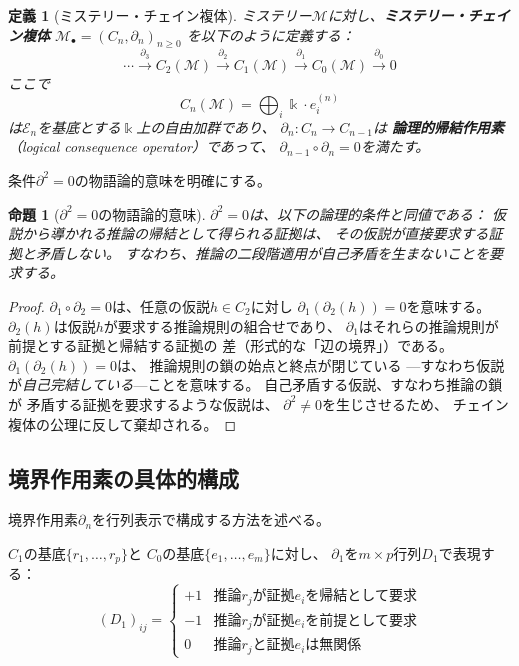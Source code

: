 \documentclass[12pt,twocolumn]{ltjsarticle}
\newtheorem{proposition}[theorem]{命題}
\newtheorem{definition}[theorem]{定義}
\newcommand{\Ev}{\mathcal{E}}
\newcommand{\Mys}{\mathcal{M}}
\newcommand{\kk}{\Bbbk}
\begin{document}
\begin{definition}[ミステリー・チェイン複体]
\label{def:mystery_chain}
ミステリー$\Mys$に対し、\textbf{ミステリー・チェイン複体}
$\Mys_\bullet = (C_n, \partial_n)_{n \geq 0}$ を以下のように定義する：
\begin{equation}
\cdots \xrightarrow{\partial_3} C_2(\Mys) \xrightarrow{\partial_2}
C_1(\Mys) \xrightarrow{\partial_1} C_0(\Mys) \xrightarrow{\partial_0} 0
\label{eq:chain}
\end{equation}
ここで
\begin{equation}
C_n(\Mys) = \bigoplus_{i} \kk \cdot e_i^{(n)}
\end{equation}
は$\Ev_n$を基底とする$\kk$上の自由加群であり、
$\partial_n: C_n \to C_{n-1}$は
\textbf{論理的帰結作用素}（logical consequence operator）であって、
$\partial_{n-1} \circ \partial_n = 0$を満たす。
\end{definition}

条件$\partial^2 = 0$の物語論的意味を明確にする。

\begin{proposition}[$\partial^2 = 0$の物語論的意味]
\label{prop:d_squared}
$\partial^2 = 0$は、以下の論理的条件と同値である：
\emph{仮説から導かれる推論の帰結として得られる証拠は、
その仮説が直接要求する証拠と矛盾しない。}
すなわち、推論の二段階適用が自己矛盾を生まないことを要求する。
\end{proposition}

\begin{proof}
$\partial_1 \circ \partial_2 = 0$は、任意の仮説$h \in C_2$に対し
$\partial_1(\partial_2(h)) = 0$を意味する。
$\partial_2(h)$は仮説$h$が要求する推論規則の組合せであり、
$\partial_1$はそれらの推論規則が前提とする証拠と帰結する証拠の
差（形式的な「辺の境界」）である。
$\partial_1(\partial_2(h)) = 0$は、
推論規則の鎖の始点と終点が閉じている
---すなわち仮説が\emph{自己完結している}---ことを意味する。
自己矛盾する仮説、すなわち推論の鎖が
矛盾する証拠を要求するような仮説は、
$\partial^2 \neq 0$を生じさせるため、
チェイン複体の公理に反して棄却される。
\end{proof}

\subsection{境界作用素の具体的構成}

境界作用素$\partial_n$を行列表示で構成する方法を述べる。

$C_1$の基底$\{r_1, \ldots, r_p\}$と
$C_0$の基底$\{e_1, \ldots, e_m\}$に対し、
$\partial_1$を$m \times p$行列$D_1$で表現する：
\begin{equation}
(D_1)_{ij} = \begin{cases}
+1 & \text{推論$r_j$が証拠$e_i$を帰結として要求} \\
-1 & \text{推論$r_j$が証拠$e_i$を前提として要求} \\
0 & \text{推論$r_j$と証拠$e_i$は無関係}
\end{cases}
\label{eq:D1}
\end{equation}
\end{document}
